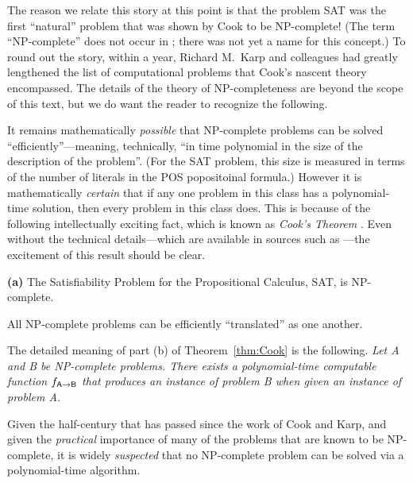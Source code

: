 The reason we relate this story at this point is that the problem {\sf
  SAT} was the first ``natural'' problem that was shown by Cook to be
{\sf NP}-complete!  (The term ``{\sf NP}-complete'' does not occur in
\cite{Cook71}; there was not yet a name for this concept.)  To round
out the story, within a year, Richard M.~Karp 
and colleagues had greatly lengthened the list of computational
problems that Cook's nascent theory encompassed.  The details of the
theory of {\sf NP}-completeness are beyond the scope of this text, but
we do want the reader to recognize the following.

It remains mathematically {\em possible} that {\sf NP}-complete
problems can be solved ``efficiently''---meaning, technically, ``in
time polynomial in the size of the description of the problem''.  (For
the {\sf SAT} problem, this size is measured in terms of the number of
literals in the POS popositoinal formula.)  However it is
mathematically {\em certain} that if any one problem in this class has
a polynomial-time solution, then every problem in this class does.
This is because of the following intellectually exciting fact, which
is known as {\it Cook's Theorem} .  Even without
the technical details---which are available in sources such as
\cite{GareyJ79,Rosenberg09}---the excitement of this result should be
clear.

\begin{theorem}
\label{thm:Cook}
{\bf (a)}
The Satisfiability Problem for the Propositional Calculus, {\sf SAT},
is {\sf NP}-complete.

All {\sf NP}-complete problems can be efficiently ``translated'' as
one another.
\end{theorem}

The detailed meaning of part (b) of Theorem~\ref{thm:Cook} is the
following.  {\em Let {\sf A} and {\sf B} be {\sf NP}-complete
  problems.  There exists a polynomial-time computable function
  $f_{{\sf A} \rightarrow {\sf B}}$ that produces an instance of
  problem {\sf B} when given an instance of problem {\sf A}.}

\medskip

Given the half-century that has passed since the work of Cook and
Karp, and given the {\em practical} importance of many of the problems
that are known to be {\sf NP}-complete, it is widely {\em suspected}
that no {\sf NP}-complete problem can be solved via a polynomial-time
algorithm.

